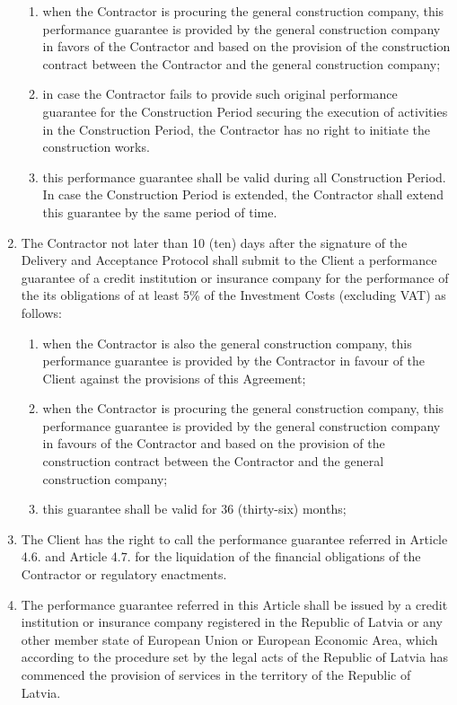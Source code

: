 \begin{multicols}{2}
\begin{enumerate}
\begin{enumerate}
		\item	when the Contractor is procuring the general construction company, this performance guarantee is provided by the general construction company in favors of the Contractor and based on the provision of the construction contract between the Contractor and the general construction company;
		\item	in case the Contractor fails to provide such original performance guarantee for the Construction Period securing the execution of activities in the Construction Period, the Contractor has no right to initiate the construction works.
		\item	this performance guarantee shall be valid during all Construction Period. In case the Construction Period is extended, the Contractor shall extend this guarantee by the same period of time.
	\end{enumerate}
	\item	The Contractor not later than 10 (ten) days after the signature of the Delivery and Acceptance Protocol shall submit to the Client a performance guarantee of a credit institution or insurance company for the performance of the its obligations of at least 5\% of the Investment Costs (excluding VAT) as follows:
	\begin{enumerate}
		\item	when the Contractor is also the general construction company, this performance guarantee is provided by the Contractor in favour of the Client against the provisions of this Agreement;
		\item	when the Contractor is procuring the general construction company, this performance guarantee is provided by the general construction company in favours of the Contractor and based on the provision of the construction contract between the Contractor and the general construction company;
		\item	this guarantee shall be valid for 36 (thirty-six) months;
	\end{enumerate}
	\item	The Client has the right to call the performance guarantee referred in Article 4.6. and Article 4.7. for the liquidation of the financial obligations of the Contractor or regulatory enactments. %
	\item	The performance guarantee referred in this Article shall be issued by a credit institution or insurance company registered in the Republic of Latvia or any other member state of European Union or European Economic Area, which according to the procedure set by the legal acts of the Republic of Latvia has commenced the provision of services in the territory of the Republic of Latvia.
\end{enumerate}


\end{multicols}
